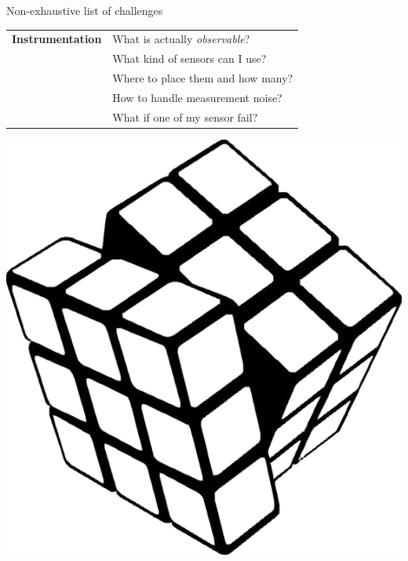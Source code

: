 \documentclass[aspectratio=169,compress,12pt,dvipsnames]{beamer}
\begin{document}
\begin{frame}[t, c]{Non-exhaustive list of challenges}
    \vfill
    \begin{minipage}{.68\textwidth}
        \centering
        \begin{tabular}{rl}
            \textbf{Instrumentation}    &   What is actually \emph{observable}? \\
                                        &   What kind of sensors can I use?     \\
                                        &   Where to place them and how many?   \\
                                        &   How to handle measurement noise?    \\
                                        &   What if one of my sensor fail?
        \end{tabular}
    \end{minipage}%
    \hfill
    \begin{minipage}{.28\textwidth}
        \centering
        \includegraphics[width=\textwidth]{rubik_cube.png}
    \end{minipage}
    \vfill
\end{frame}
\end{document}
